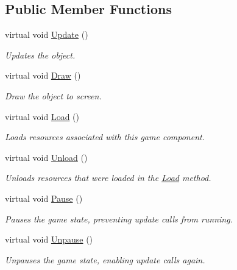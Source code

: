 \subsection*{Public Member Functions}
\begin{DoxyCompactItemize}
\item 
virtual void \hyperlink{class_tri_devs_1_1_tri_engine_1_1_state_management_1_1_game_state_a58eb7b07ebc6df4fc3052bfafaed807d}{Update} ()
\begin{DoxyCompactList}\small\item\em Updates the object. \end{DoxyCompactList}\item 
virtual void \hyperlink{class_tri_devs_1_1_tri_engine_1_1_state_management_1_1_game_state_a80f91b91cef4694250ba9a2c238e42d2}{Draw} ()
\begin{DoxyCompactList}\small\item\em Draw the object to screen. \end{DoxyCompactList}\item 
virtual void \hyperlink{class_tri_devs_1_1_tri_engine_1_1_state_management_1_1_game_state_adf7c58ffb318c3afc07afeae539877c2}{Load} ()
\begin{DoxyCompactList}\small\item\em Loads resources associated with this game component. \end{DoxyCompactList}\item 
virtual void \hyperlink{class_tri_devs_1_1_tri_engine_1_1_state_management_1_1_game_state_aac25dd6298806571ffad8275341b29c1}{Unload} ()
\begin{DoxyCompactList}\small\item\em Unloads resources that were loaded in the \hyperlink{class_tri_devs_1_1_tri_engine_1_1_state_management_1_1_game_state_adf7c58ffb318c3afc07afeae539877c2}{Load} method. \end{DoxyCompactList}\item 
virtual void \hyperlink{class_tri_devs_1_1_tri_engine_1_1_state_management_1_1_game_state_aa8005451d86c82c9709207f65dc04127}{Pause} ()
\begin{DoxyCompactList}\small\item\em Pauses the game state, preventing update calls from running. \end{DoxyCompactList}\item 
virtual void \hyperlink{class_tri_devs_1_1_tri_engine_1_1_state_management_1_1_game_state_a7763ba58f9afc92158bc6dfd784e0a9f}{Unpause} ()
\begin{DoxyCompactList}\small\item\em Unpauses the game state, enabling update calls again. \end{DoxyCompactList}\item 

\end{DoxyCompactItemize}
